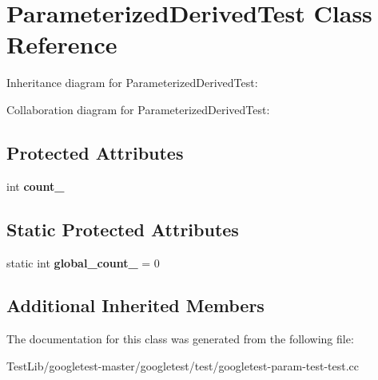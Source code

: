 \hypertarget{classParameterizedDerivedTest}{}\section{Parameterized\+Derived\+Test Class Reference}
\label{classParameterizedDerivedTest}


Inheritance diagram for Parameterized\+Derived\+Test\+:


Collaboration diagram for Parameterized\+Derived\+Test\+:
\subsection*{Protected Attributes}
\begin{DoxyCompactItemize}
\item 
\mbox{\label{classParameterizedDerivedTest_ad8a2968265e7477c13585d17bbd0492c}} 
int {\bfseries count\+\_\+}
\end{DoxyCompactItemize}
\subsection*{Static Protected Attributes}
\begin{DoxyCompactItemize}
\item 
\mbox{\label{classParameterizedDerivedTest_ab6c067a099764a9d58b5f2e8ebcb5d0f}} 
static int {\bfseries global\+\_\+count\+\_\+} = 0
\end{DoxyCompactItemize}
\subsection*{Additional Inherited Members}


The documentation for this class was generated from the following file\+:\begin{DoxyCompactItemize}
\item 
Test\+Lib/googletest-\/master/googletest/test/googletest-\/param-\/test-\/test.\+cc\end{DoxyCompactItemize}
